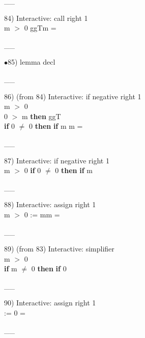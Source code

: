 \documentclass[a4paper]{article}
\begin{document}
\vspace{-1.5ex}\_\hrulefill \_

84) Interactive: call right  1\\
m $>$ 0 \Fol \Do ggT\Dc m = 

\vspace{-1.5ex}\_\hrulefill \_

$\bullet$85) lemma decl \\
 \Fol 

\vspace{-1.5ex}\_\hrulefill \_

86)  (from 84) Interactive: if negative right  1\\
\tabf m $>$ 0 \\
\Fol {} 0 $>$ m {\bf then} ggT \\
 \tabf {} {\bf if} 0 $\neq$ 0 {\bf then} {\bf if} m %
m = 

\vspace{-1.5ex}\_\hrulefill \_

87) Interactive: if negative right  1\\
m $>$ 0 \Fol \Do 
{\bf if} 0 $\neq$ 0 {\bf then} 
{\bf if} m %

\vspace{-1.5ex}\_\hrulefill \_

88) Interactive: assign right  1\\
m $>$ 0 \Fol \Do {} := m\Dc m = 

\vspace{-1.5ex}\_\hrulefill \_

89)  (from 83) Interactive: simplifier \\
\tabf \Not m $>$ 0 \\
\Fol \Do 
{\bf if} m $\neq$ 0 {\bf then} 
{\bf if} 0 %

\vspace{-1.5ex}\_\hrulefill \_

90) Interactive: assign right  1\\
 \Fol \Do {} := 0 = 

\vspace{-1.5ex}\_\hrulefill \_
\end{document}
